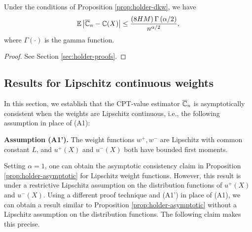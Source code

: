 \begin{corollary}
\label{cor:holder-dkw}
Under the conditions of Proposition \ref{prop:holder-dkw}, we have
$$
\mathbb{E} \left|\overline {\mathbb{C}}_n- \mathbb{C}(X) \right|  \le    \frac{\left(8HM\right) \Gamma\left(\alpha/2\right)}{n^{\alpha/2}},$$
where $\Gamma(\cdot)$ is the gamma function.
\end{corollary}

\begin{proof}
%
%
See Section \ref{sec:holder-proofs}.
\end{proof}

\subsection{Results for Lipschitz continuous weights}
In this section, we establish that the CPT-value estimator $\overline {\mathbb{C}}_n$ is asymptotically consistent when the weights are Lipschitz continuous,  i.e., the following assumption in place of (A1):

\noindent\textbf{Assumption (A1').}  The weight functions $w^+, w^-$ are Lipschitz with common constant $L$, and 
$u^+(X)$ and $u^-(X)$ both have bounded first moments.

Setting $\alpha=1$, one can obtain the asymptotic consistency claim in Proposition \ref{prop:holder-asymptotic} for Lipschitz weight functions. However, this result is under  a restrictive Lipschitz assumption on the distribution functions of $u^+(X)$ and $u^-(X)$. Using a different proof technique and (A1') in place of (A1), we can obtain a result similar to Proposition \ref{prop:holder-asymptotic} without a Lipschitz assumption on the distribution functions. The following claim makes this precise.

